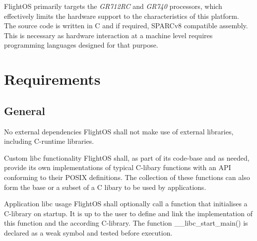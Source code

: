 FlightOS primarily targets the \emph{GR712RC} and \emph{GR740} processors,
which effectively limits the hardware support to the characteristics of this platform. \\
\noindent
The source code is written in C and if required, \gls{SPARC}v8 compatible
assembly. This is necessary as hardware interaction at a machine level requires
programming languages designed for that purpose.



\chapter{Requirements}

\section{General}


 {No external dependencies}{%
FlightOS shall not make use of external libraries, including C-runtime libraries.
}{}%

 {Custom libc functionality}{%
FlightOS shall, as part of its code-base and as needed, provide its own
implementations of typical C-libary functions with an \gls{API} conforming to
their \gls{POSIX} definitions.
}{%
The collection of these functions can also form the base or a subset of a
C libary to be used by applications.}%

 {Application libc usage}{%
FlightOS shall optionally call a function that initialises a C-library on startup.
It is up to the user to define and link the implementation of this function and
the according C-library.
}{%
The function \_\_libc\_start\_main() is declared as a weak symbol and tested
before execution.
}%


%
%
%
%

